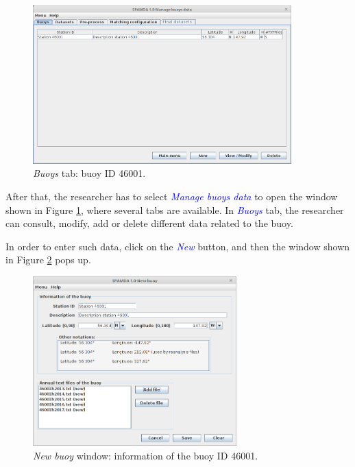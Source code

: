 \documentclass[energies,article,submit,moreauthors,pdftex]{Definitions/mdpi}
\begin{document}
			\begin{figure}[ht!]
				\centering
				\includegraphics[width=0.89\textwidth]{figures/FigureManage_buoys.png}
				\caption{\textit{Buoys} tab: buoy ID 46001.}\label{fig:manage_buoys}
			\end{figure}
			
			After that, the researcher has to select \textcolor{blue}{\textit{Manage buoys data}} to open the window shown in Figure \ref{fig:manage_buoys}, where several tabs are available. In \textcolor{blue}{\textit{Buoys}} tab, the researcher can consult, modify, add or delete different data related to the buoy.
			
			In order to enter such data, click on the \textcolor{blue}{\textit{New}} button, and then the window shown in Figure \ref{fig:new_buoy} pops up.

			\begin{figure}[ht!]
				\centering
				\includegraphics[width=0.70\textwidth]{figures/FigureNew_buoy.png}
				\caption{\textit{New buoy} window: information of the buoy ID 46001.}\label{fig:new_buoy}
			\end{figure}
			
\end{document}

